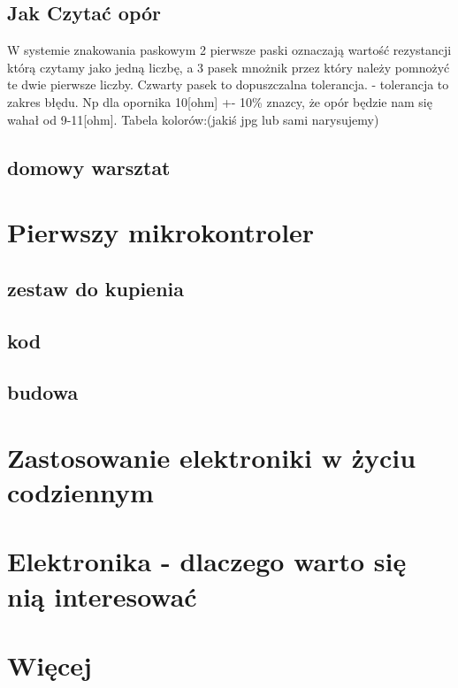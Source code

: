 \documentclass[a4paper,10pt]{report}
\begin{document}
	\section{Jak Czytać opór}
	W systemie znakowania paskowym 2 pierwsze paski oznaczają wartość rezystancji którą czytamy jako jedną liczbę, a 3 pasek mnożnik przez który należy pomnożyć te dwie pierwsze liczby.
Czwarty pasek to dopuszczalna tolerancja. - tolerancja to zakres błędu. Np dla opornika 10[ohm] +- 10\% znazcy, że opór będzie nam się wahał od 9-11[ohm].
Tabela kolorów:(jakiś jpg lub sami narysujemy)

	\section {domowy warsztat}
\chapter{Pierwszy mikrokontroler}
	\section{zestaw do kupienia}
	\section{kod}
	\section{budowa}
\chapter {Zastosowanie elektroniki w życiu codziennym }
\chapter{Elektronika - dlaczego warto się nią interesować}
\chapter {Więcej}

\end{document}
